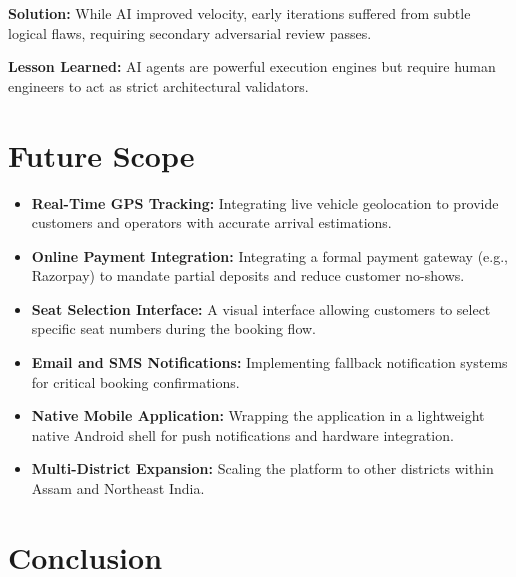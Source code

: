 \documentclass[12pt, a4paper, oneside]{report}
\begin{document}
\begin{challengebox}
\textbf{Solution:} While AI improved velocity, early iterations suffered from subtle logical flaws, requiring secondary adversarial review passes.

\vspace{0.5em}\noindent\textbf{Lesson Learned:} AI agents are powerful execution engines but require human engineers to act as strict architectural validators.
\end{challengebox}

\chapter{Future Scope}

\begin{itemize}[leftmargin=*]
    \item \textbf{Real-Time GPS Tracking:} Integrating live vehicle geolocation to provide customers and operators with accurate arrival estimations.
    \item \textbf{Online Payment Integration:} Integrating a formal payment gateway (e.g., Razorpay) to mandate partial deposits and reduce customer no-shows.
    \item \textbf{Seat Selection Interface:} A visual interface allowing customers to select specific seat numbers during the booking flow.
    \item \textbf{Email and SMS Notifications:} Implementing fallback notification systems for critical booking confirmations.
    \item \textbf{Native Mobile Application:} Wrapping the application in a lightweight native Android shell for push notifications and hardware integration.
    \item \textbf{Multi-District Expansion:} Scaling the platform to other districts within Assam and Northeast India.
\end{itemize}

\chapter{Conclusion}
\end{document}

